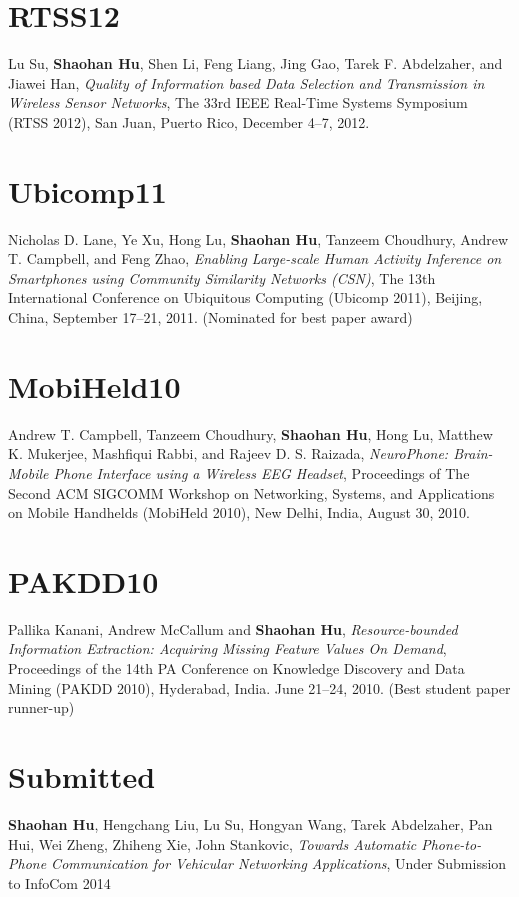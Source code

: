 \section{\sc RTSS12}
Lu Su, \textbf{Shaohan Hu}, Shen Li, Feng Liang, Jing Gao, Tarek
F. Abdelzaher, and Jiawei Han, \emph{Quality of Information based Data
  Selection and Transmission in Wireless Sensor Networks}, \textsf{The
  33rd IEEE Real-Time Systems Symposium (RTSS 2012)}, San Juan, Puerto
Rico, December 4--7, 2012.

\section{\sc Ubicomp11}
Nicholas D. Lane, Ye Xu, Hong Lu, \textbf{Shaohan Hu}, Tanzeem
Choudhury, Andrew T. Campbell, and Feng Zhao, \emph{Enabling
  Large-scale Human Activity Inference on Smartphones using Community
  Similarity Networks (CSN)}, \textsf{The 13th International
  Conference on Ubiquitous Computing (Ubicomp 2011)}, Beijing, China,
September 17--21, 2011. (Nominated for best paper award)

\section{\sc MobiHeld10}
Andrew T. Campbell, Tanzeem Choudhury, \textbf{Shaohan Hu}, Hong Lu,
Matthew K. Mukerjee, Mashfiqui Rabbi, and Rajeev D. S. Raizada,
\emph{NeuroPhone: Brain-Mobile Phone Interface using a Wireless EEG
  Headset}, \textsf{Proceedings of The Second ACM SIGCOMM Workshop on
  Networking, Systems, and Applications on Mobile Handhelds (MobiHeld
  2010)}, New Delhi, India, August 30, 2010.

\section{\sc PAKDD10}
Pallika Kanani, Andrew McCallum and \textbf{Shaohan Hu},
\emph{Resource-bounded Information Extraction: Acquiring Missing
  Feature Values On Demand}, \textsf{Proceedings of the 14th PA
  Conference on Knowledge Discovery and Data Mining (PAKDD 2010)},
Hyderabad, India. June 21--24, 2010. (Best student paper runner-up)


\section{\sc Submitted}
\textbf{Shaohan Hu}, Hengchang Liu, Lu Su, Hongyan Wang, Tarek
Abdelzaher, Pan Hui, Wei Zheng, Zhiheng Xie, John Stankovic,
\emph{Towards Automatic Phone-to-Phone Communication for Vehicular
  Networking Applications}, \textsf{Under Submission to InfoCom 2014}
